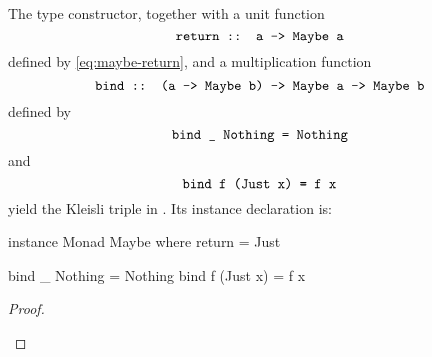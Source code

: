 \begin{example}
  \label{ex:triple-maybe-haskell}

  The  type constructor, together with a unit
  function
  \begin{equation*}
    \text{\texttt{return :: a -> Maybe a}}
  \end{equation*}
  defined by \eqref{eq:maybe-return}, and a multiplication function
  \begin{equation*}
    \text{\texttt{bind :: (a -> Maybe b) -> Maybe a -> Maybe b}}
  \end{equation*}
  defined by
  \begin{equation}
    \label{eq:maybe-bind-nothing}
    \text{\texttt{bind \_ Nothing = Nothing}}
  \end{equation}
  and
  \begin{equation}
    \label{eq:maybe-bind-just}
    \text{\texttt{bind f (Just x) = f x}}
  \end{equation}
  yield the  Kleisli triple in \hask. Its instance
  declaration is:

  \begin{codehaskell}
instance Monad Maybe where
  return = Just

  bind _ Nothing  = Nothing
  bind f (Just x) = f x
  \end{codehaskell}

  \begin{proof}

    \hfill
    \begin{steps}
    \end{steps}

    \begin{steps}
    \end{steps}

    \begin{steps}
    \end{steps}

    \begin{steps}
    \end{steps}


\end{proof}
\end{example}
